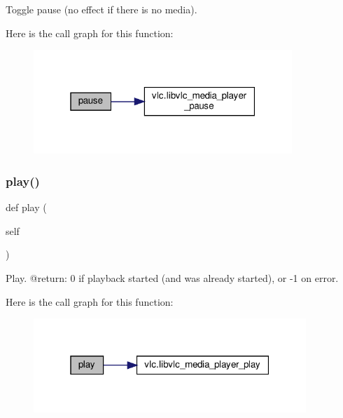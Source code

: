 \begin{DoxyVerb}Toggle pause (no effect if there is no media).
\end{DoxyVerb}
 Here is the call graph for this function\+:
\nopagebreak
\begin{figure}[H]
\begin{center}
\leavevmode
\includegraphics[width=277pt]{classvlc_1_1_media_player_aee7a4c35e3232c131ff62b5866eb4a16_cgraph}
\end{center}
\end{figure}
\mbox{\label{classvlc_1_1_media_player_a9942567d8012950a20b0798b4203bb57}} 
\subsubsection{\texorpdfstring{play()}{play()}}
{\footnotesize\ttfamily def play (\begin{DoxyParamCaption}\item[{}]{self }\end{DoxyParamCaption})}

\begin{DoxyVerb}Play.
@return: 0 if playback started (and was already started), or -1 on error.
\end{DoxyVerb}
 Here is the call graph for this function\+:
\nopagebreak
\begin{figure}[H]
\begin{center}
\leavevmode
\includegraphics[width=292pt]{classvlc_1_1_media_player_a9942567d8012950a20b0798b4203bb57_cgraph}
\end{center}
\end{figure}
\mbox{\label{classvlc_1_1_media_player_aeab748e2d6ccb4b1fe101585b682a359}} 
